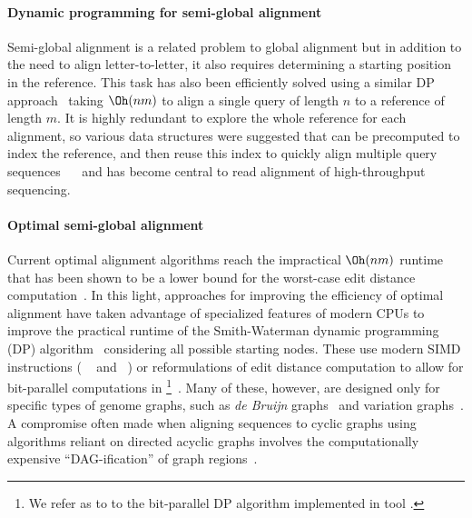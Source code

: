 \paragraph{Dynamic programming for semi-global alignment}
Semi-global alignment is a related problem to global alignment but in addition
to the need to align letter-to-letter, it also requires determining a starting
position in the reference. This task has also been efficiently solved using a
similar DP approach~\cite{sellers1980theory,smith1981identification} taking
$\Oh(nm)$ to align a single query of length $n$ to a reference of length $m$. It
is highly redundant to explore the whole reference for each alignment, so
various data structures were suggested that can be precomputed to index the
reference, and then reuse this index to quickly align multiple query sequences
~\citeyear{pearson1988improved}~\cite{pearson1988improved} and has become
central to read alignment of high-throughput sequencing.

\paragraph{Optimal semi-global alignment}
Current optimal alignment algorithms reach the impractical $\Oh(nm)$ runtime
that has been shown to be a lower bound for the worst-case edit distance
computation~\cite{backurs2015edit}. In this light, approaches for improving the
efficiency of optimal alignment have taken advantage of specialized features of
modern CPUs to improve the practical runtime of the Smith-Waterman dynamic
programming (DP) algorithm~\cite{smith_comparison_1981} considering all possible
starting nodes. These use modern SIMD instructions (\AG
\vg~\cite{garrison_variation_2018} and \pasgal~\cite{jain_accelerating_2019}) or
reformulations of edit distance computation to allow for bit-parallel
computations in \graphaligner \footnote{We refer as \bitparallel to to the
bit-parallel DP algorithm implemented in \graphaligner tool
\cite{rautiainen_bitparallel_2019}.}~\cite{rautiainen_bitparallel_2019}. Many of
these, however, are designed only for specific types of genome graphs, such as
{\itshape de Bruijn}
graphs~\cite{liu_debga_2016,limasset2019toward} and
variation graphs~\cite{garrison_variation_2018}. A compromise often made when
aligning sequences to cyclic graphs using algorithms reliant on directed acyclic
graphs involves the computationally expensive ``DAG-ification'' of graph
regions~\cite{kavya_sequence_2019,garrison_variation_2018}.

